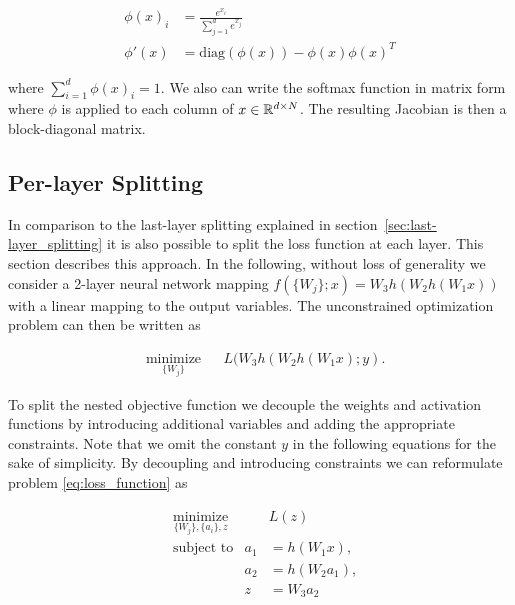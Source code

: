 \documentclass[english,11pt,a4paper]{article}
\begin{document}
\begin{equation}
	\begin{aligned}
		\phi(x)_i &= \frac{e^{x_i}}{\sum_{j=1}^{d} e^{x_j}} \\
		\phi'(x) &= \text{diag}(\phi(x)) - \phi(x) \phi(x)^T
	\end{aligned}
\end{equation}

where $\sum_{i=1}^{d}\phi(x)_i = 1$. We also can write the softmax function in matrix form where $\phi$ is applied to each column of $x \in \mathbb{R}^{d \times N}$. The resulting Jacobian is then a block-diagonal matrix.

\subsection{Per-layer Splitting}

In comparison to the last-layer splitting explained in section~\ref{sec:last-layer_splitting} it is also possible to split the loss function at each layer. This section describes this approach. In the following, without loss of generality we consider a 2-layer neural network mapping $f(\{W_j\};x) = W_3h(W_2h(W_1x))$ with a linear mapping to the output variables. The unconstrained optimization problem can then be written as

\begin{equation}
	\begin{aligned}
		& \underset{\{W_j\}}{\text{minimize}}
		& & L(W_3h(W_2h(W_1x);y).
	\end{aligned}
	\label{eq:loss_function}
\end{equation}

To split the nested objective function we decouple the weights and activation functions by introducing additional variables and adding the appropriate constraints. Note that we omit the constant $y$ in the following equations for the sake of simplicity. By decoupling and introducing constraints we can reformulate problem \ref{eq:loss_function} as

\begin{equation}
	\begin{aligned}
		& \underset{\{W_j\},\{a_i\},z}{\text{minimize}} && L(z) \\
		& \text{subject to} & a_1 &= h(W_1x), \\
		&& a_2 &= h(W_2a_1), \\
		&& z &= W_3a_2
	\end{aligned}
\end{equation}
\end{document}
